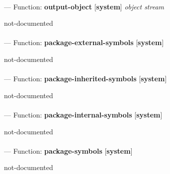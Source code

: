 \paragraph{}
\label{SYSTEM:OUTPUT-OBJECT}
--- Function: \textbf{output-object} [\textbf{system}] \textit{object stream}

\begin{adjustwidth}{5em}{5em}
not-documented
\end{adjustwidth}

\paragraph{}
\label{SYSTEM:PACKAGE-EXTERNAL-SYMBOLS}
--- Function: \textbf{package-external-symbols} [\textbf{system}] \textit{}

\begin{adjustwidth}{5em}{5em}
not-documented
\end{adjustwidth}

\paragraph{}
\label{SYSTEM:PACKAGE-INHERITED-SYMBOLS}
--- Function: \textbf{package-inherited-symbols} [\textbf{system}] \textit{}

\begin{adjustwidth}{5em}{5em}
not-documented
\end{adjustwidth}

\paragraph{}
\label{SYSTEM:PACKAGE-INTERNAL-SYMBOLS}
--- Function: \textbf{package-internal-symbols} [\textbf{system}] \textit{}

\begin{adjustwidth}{5em}{5em}
not-documented
\end{adjustwidth}

\paragraph{}
\label{SYSTEM:PACKAGE-SYMBOLS}
--- Function: \textbf{package-symbols} [\textbf{system}] \textit{}

\begin{adjustwidth}{5em}{5em}
not-documented
\end{adjustwidth}

